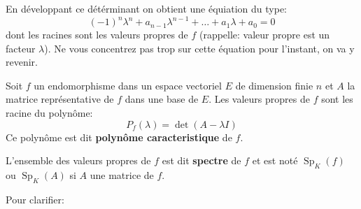 En développant ce détérminant on obtient une équiation du type:
\[
    (-1)^n\lambda^n + a_{n-1}\lambda^{n-1} + \ldots + a_1\lambda + a_0 = 0
\] 
dont les racines sont les valeurs propres de $f$ (rappelle: valeur propre est un facteur $\lambda$).
Ne vous concentrez pas trop sur cette équation pour l'instant, on va y revenir.
\begin{prop}\label{prop:polynome-caracteristique}
   Soit $f$ un endomorphisme dans un espace vectoriel  $E$ de dimension finie  $n$ et $A$ la matrice représentative de  $f$ dans une base de  $E$. Les valeurs propres de  $f$ sont les racine du polynôme:
   \[
   P_f(\lambda) = \det(A - \lambda I)
   \] 
   Ce polynôme est dit \textbf{polynôme caracteristique} de $f$.
\end{prop}
\begin{definition}
    L'ensemble des valeurs propres de $f$ est dit  \textbf{spectre} de $f$ et est noté  $\operatorname{Sp}_K(f)$ ou  $\operatorname{Sp}_K(A)$ si $A$ une matrice de  $f$.
\end{definition}
Pour clarifier:
